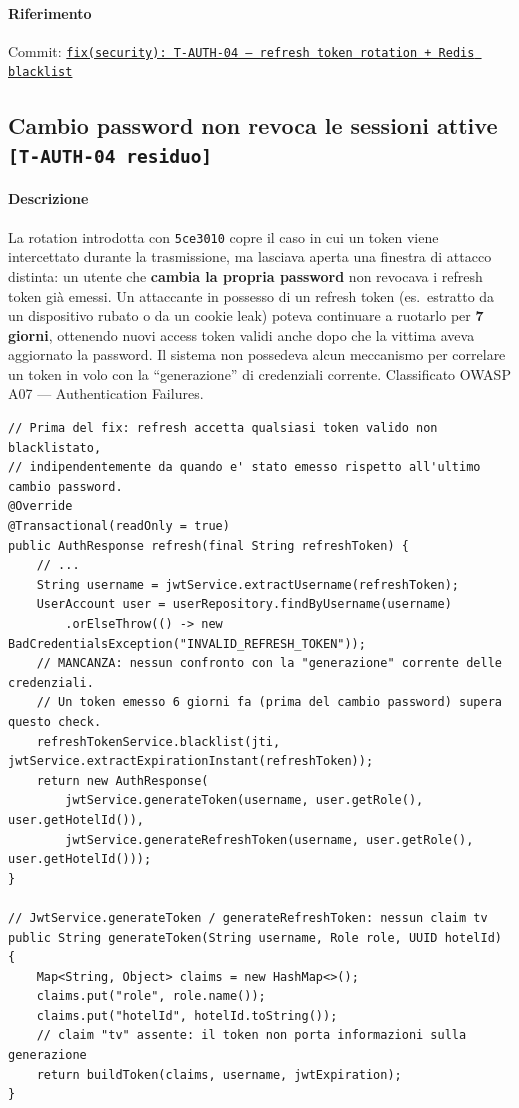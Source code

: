﻿\documentclass[a4paper,12pt]{report}
\newcommand{\commitref}[2]{\texttt{\small \href{https://github.com/diegoandruccioli/hotel-pms/commit/#1}{#2}}}
\newcommand{\threat}[1]{\texttt{\small\textcolor{vulnred}{[#1]}}}
\begin{document}
\paragraph{Riferimento} Commit: \commitref{5ce3010}{fix(security): T-AUTH-04 --- refresh token rotation + Redis blacklist}

\subsection{Cambio password non revoca le sessioni attive \threat{T-AUTH-04 residuo}}

\paragraph{Descrizione}
La rotation introdotta con \texttt{5ce3010} copre il caso in cui un token viene
intercettato durante la trasmissione, ma lasciava aperta una finestra di attacco
distinta: un utente che \textbf{cambia la propria password} non revocava i refresh
token già emessi. Un attaccante in possesso di un refresh token (es.\ estratto da
un dispositivo rubato o da un cookie leak) poteva continuare a ruotarlo per
\textbf{7 giorni}, ottenendo nuovi access token validi anche dopo che la vittima
aveva aggiornato la password. Il sistema non possedeva alcun meccanismo per
correlare un token in volo con la ``generazione'' di credenziali corrente.
Classificato OWASP A07 --- Authentication Failures.

\begin{insecurebox}[title={Codice Vulnerabile --- AuthServiceImpl.java (refresh senza controllo versione)}]
\begin{lstlisting}[style=java]
// Prima del fix: refresh accetta qualsiasi token valido non blacklistato,
// indipendentemente da quando e' stato emesso rispetto all'ultimo cambio password.
@Override
@Transactional(readOnly = true)
public AuthResponse refresh(final String refreshToken) {
    // ...
    String username = jwtService.extractUsername(refreshToken);
    UserAccount user = userRepository.findByUsername(username)
        .orElseThrow(() -> new BadCredentialsException("INVALID_REFRESH_TOKEN"));
    // MANCANZA: nessun confronto con la "generazione" corrente delle credenziali.
    // Un token emesso 6 giorni fa (prima del cambio password) supera questo check.
    refreshTokenService.blacklist(jti, jwtService.extractExpirationInstant(refreshToken));
    return new AuthResponse(
        jwtService.generateToken(username, user.getRole(), user.getHotelId()),
        jwtService.generateRefreshToken(username, user.getRole(), user.getHotelId()));
}

// JwtService.generateToken / generateRefreshToken: nessun claim tv
public String generateToken(String username, Role role, UUID hotelId) {
    Map<String, Object> claims = new HashMap<>();
    claims.put("role", role.name());
    claims.put("hotelId", hotelId.toString());
    // claim "tv" assente: il token non porta informazioni sulla generazione
    return buildToken(claims, username, jwtExpiration);
}
\end{lstlisting}
\end{insecurebox}
\end{document}
